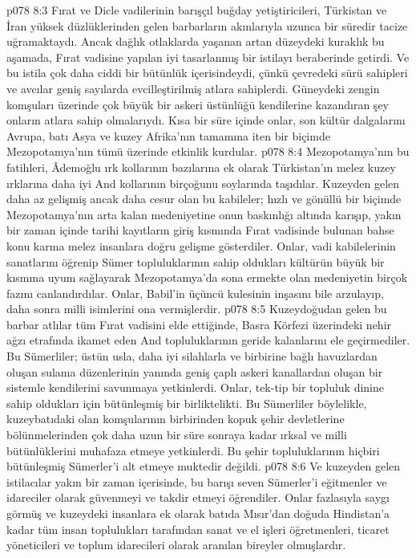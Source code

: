 \vs p078 8:3 Fırat ve Dicle vadilerinin barışçıl buğday yetiştiricileri, Türkistan ve İran yüksek düzlüklerinden gelen barbarların akınlarıyla uzunca bir süredir tacize uğramaktaydı. Ancak dağlık otlaklarda yaşanan artan düzeydeki kuraklık bu aşamada, Fırat vadisine yapılan iyi tasarlanmış bir istilayı beraberinde getirdi. Ve bu istila çok daha ciddi bir bütünlük içerisindeydi, çünkü çevredeki sürü sahipleri ve avcılar geniş sayılarda evcilleştirilmiş atlara sahiplerdi. Güneydeki zengin komşuları üzerinde çok büyük bir askeri üstünlüğü kendilerine kazandıran şey onların atlara sahip olmalarıydı. Kısa bir süre içinde onlar, son kültür dalgalarını Avrupa, batı Asya ve kuzey Afrika’nın tamamına iten bir biçimde Mezopotamya’nın tümü üzerinde etkinlik kurdular.
\vs p078 8:4 Mezopotamya’nın bu fatihleri, Âdemoğlu ırk kollarının bazılarına ek olarak Türkistan’ın melez kuzey ırklarına daha iyi And kollarının birçoğunu soylarında taşıdılar. Kuzeyden gelen daha az gelişmiş ancak daha cesur olan bu kabileler; hızlı ve gönüllü bir biçimde Mezopotamya’nın arta kalan medeniyetine onun baskınlığı altında karışıp, yakın bir zaman içinde tarihi kayıtların giriş kısmında Fırat vadisinde bulunan bahse konu karma melez insanlara doğru gelişme gösterdiler. Onlar, vadi kabilelerinin sanatlarını öğrenip Sümer topluluklarının sahip oldukları kültürün büyük bir kısmına uyum sağlayarak Mezopotamya’da sona ermekte olan medeniyetin birçok fazını canlandırdılar. Onlar, Babil’in üçüncü kulesinin inşasını bile arzulayıp, daha sonra milli isimlerini ona vermişlerdir.
\vs p078 8:5 Kuzeydoğudan gelen bu barbar atlılar tüm Fırat vadisini elde ettiğinde, Basra Körfezi üzerindeki nehir ağzı etrafında ikamet eden And topluluklarının geride kalanlarını ele geçirmediler. Bu Sümerliler; üstün usla, daha iyi silahlarla ve birbirine bağlı havuzlardan oluşan sulama düzenlerinin yanında geniş çaplı askeri kanallardan oluşan bir sistemle kendilerini savunmaya yetkinlerdi. Onlar, tek\hyp{}tip bir topluluk dinine sahip oldukları için bütünleşmiş bir birliktelikti. Bu Sümerliler böylelikle, kuzeybatıdaki olan komşularının birbirinden kopuk şehir devletlerine bölünmelerinden çok daha uzun bir süre sonraya kadar ırksal ve milli bütünlüklerini muhafaza etmeye yetkinlerdi. Bu şehir topluluklarının hiçbiri bütünleşmiş Sümerler’i alt etmeye muktedir değildi.
\vs p078 8:6 Ve kuzeyden gelen istilacılar yakın bir zaman içerisinde, bu barışı seven Sümerler’i eğitmenler ve idareciler olarak güvenmeyi ve takdir etmeyi öğrendiler. Onlar fazlasıyla saygı görmüş ve kuzeydeki insanlara ek olarak batıda Mısır’dan doğuda Hindistan’a kadar tüm insan toplulukları tarafından sanat ve el işleri öğretmenleri, ticaret yöneticileri ve toplum idarecileri olarak aranılan bireyler olmuşlardır.
